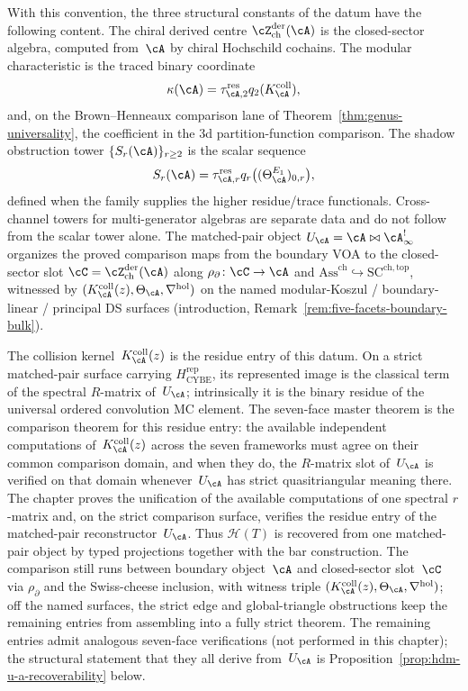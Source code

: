 With this convention, the three structural constants of the datum have
the following content. The chiral derived centre
$\cZ^{\mathrm{der}}_{\mathrm{ch}}(\cA)$ is the closed-sector algebra, computed
from~$\cA$ by chiral Hochschild cochains. The modular
characteristic is the traced binary coordinate
\[
 \kappa(\cA)=\tau_{\cA,2}^{\mathrm{res}}
 q_2(K_\cA^{\mathrm{coll}}),
\]
and, on the Brown--Henneaux comparison lane of
Theorem~\ref{thm:genus-universality}, the coefficient in the
$3$d partition-function comparison. The shadow obstruction tower
$\{S_r(\cA)\}_{r \geq 2}$ is the scalar sequence
\[
 S_r(\cA)=\tau_{\cA,r}^{\mathrm{res}}
 q_r\bigl((\Theta_\cA^{E_1})_{0,r}\bigr),
\]
defined when the family supplies the higher residue/trace
functionals. Cross-channel towers for multi-generator
algebras are separate data and do not follow from the scalar tower
alone. The matched-pair object
$U_\cA = \cA \bowtie \cA^{!}_\infty$ organizes the proved comparison
maps from the boundary VOA to the closed-sector slot
$\cC=\cZ^{\mathrm{der}}_{\mathrm{ch}}(\cA)$ along
$\rho_{\partial}\colon \cC\to\cA$ and
$\mathrm{Ass}^{\mathrm{ch}}\hookrightarrow\mathrm{SC}^{\mathrm{ch,top}}$,
witnessed by $(K_\cA^{\mathrm{coll}}(z),\Theta_\cA,\nabla^{\mathrm{hol}})$ on the
named modular-Koszul / boundary-linear / principal DS surfaces
(introduction, Remark~\ref{rem:five-facets-boundary-bulk}).

The collision kernel~$K_\cA^{\mathrm{coll}}(z)$ is the residue entry
of this datum.  On a strict matched-pair surface carrying
$H_{\mathrm{CYBE}}^{\mathrm{rep}}$, its represented image is the
classical term of the spectral $R$-matrix of~$U_\cA$; intrinsically it
is the binary residue of the universal ordered convolution MC element.
The seven-face master theorem
is the comparison theorem for this residue entry: the available independent
computations of~$K_\cA^{\mathrm{coll}}(z)$ across the seven frameworks must agree on
their common comparison domain, and when they do, the $R$-matrix slot
of~$U_\cA$ is verified on that domain whenever~$U_\cA$ has strict
quasitriangular meaning there.
The chapter proves the unification of the available computations of one
spectral $r$-matrix and, on the strict comparison surface, verifies the
residue entry of the matched-pair reconstructor~$U_\cA$. Thus
$\mathcal{H}(T)$ is recovered from one matched-pair object by typed
projections together with the bar construction. The comparison still
runs between boundary object~$\cA$ and closed-sector slot~$\cC$ via
$\rho_{\partial}$ and the Swiss-cheese inclusion, with witness triple
$(K_\cA^{\mathrm{coll}}(z),\Theta_\cA,\nabla^{\mathrm{hol}})$; off the named surfaces,
the strict edge and global-triangle obstructions keep the remaining
entries from assembling into a fully strict theorem. The remaining
entries admit analogous seven-face
verifications (not performed in this chapter); the structural
statement that they all derive from~$U_\cA$ is
Proposition~\ref{prop:hdm-u-a-recoverability} below.

